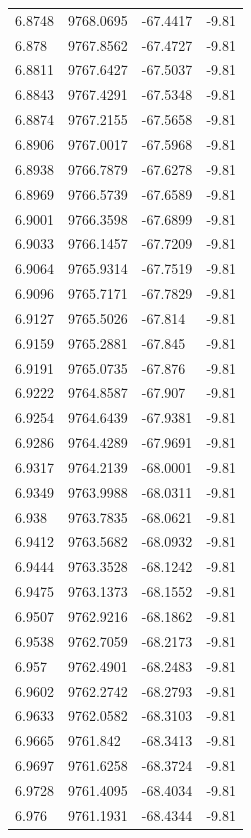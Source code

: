 \begin{table}[H]
\begin{tabular}{llll}
6.8748 & 9768.0695 & -67.4417 & -9.81 \\
6.878 & 9767.8562 & -67.4727 & -9.81 \\
6.8811 & 9767.6427 & -67.5037 & -9.81 \\
6.8843 & 9767.4291 & -67.5348 & -9.81 \\
6.8874 & 9767.2155 & -67.5658 & -9.81 \\
6.8906 & 9767.0017 & -67.5968 & -9.81 \\
6.8938 & 9766.7879 & -67.6278 & -9.81 \\
6.8969 & 9766.5739 & -67.6589 & -9.81 \\
6.9001 & 9766.3598 & -67.6899 & -9.81 \\
6.9033 & 9766.1457 & -67.7209 & -9.81 \\
6.9064 & 9765.9314 & -67.7519 & -9.81 \\
6.9096 & 9765.7171 & -67.7829 & -9.81 \\
6.9127 & 9765.5026 & -67.814 & -9.81 \\
6.9159 & 9765.2881 & -67.845 & -9.81 \\
6.9191 & 9765.0735 & -67.876 & -9.81 \\
6.9222 & 9764.8587 & -67.907 & -9.81 \\
6.9254 & 9764.6439 & -67.9381 & -9.81 \\
6.9286 & 9764.4289 & -67.9691 & -9.81 \\
6.9317 & 9764.2139 & -68.0001 & -9.81 \\
6.9349 & 9763.9988 & -68.0311 & -9.81 \\
6.938 & 9763.7835 & -68.0621 & -9.81 \\
6.9412 & 9763.5682 & -68.0932 & -9.81 \\
6.9444 & 9763.3528 & -68.1242 & -9.81 \\
6.9475 & 9763.1373 & -68.1552 & -9.81 \\
6.9507 & 9762.9216 & -68.1862 & -9.81 \\
6.9538 & 9762.7059 & -68.2173 & -9.81 \\
6.957 & 9762.4901 & -68.2483 & -9.81 \\
6.9602 & 9762.2742 & -68.2793 & -9.81 \\
6.9633 & 9762.0582 & -68.3103 & -9.81 \\
6.9665 & 9761.842 & -68.3413 & -9.81 \\
6.9697 & 9761.6258 & -68.3724 & -9.81 \\
6.9728 & 9761.4095 & -68.4034 & -9.81 \\
6.976 & 9761.1931 & -68.4344 & -9.81 \\

\end{tabular}
\end{table}
